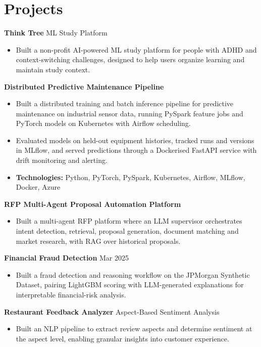\documentclass[10pt,a4paper]{article}
\begin{document}
\section{Projects}
\textbf{Think Tree} \textbar{} ML Study Platform\par
\begin{itemize}
  \item Built a non-profit AI-powered ML study platform for people with ADHD and context-switching challenges, designed to help users organize learning and maintain study context.
\end{itemize}
\textbf{Distributed Predictive Maintenance Pipeline}\par
\begin{itemize}
  \item Built a distributed training and batch inference pipeline for predictive maintenance on industrial sensor data, running PySpark feature jobs and PyTorch models on Kubernetes with Airflow scheduling.
  \item Evaluated models on held-out equipment histories, tracked runs and versions in MLflow, and served predictions through a Dockerised FastAPI service with drift monitoring and alerting.
  \item \textbf{Technologies:} Python, PyTorch, PySpark, Kubernetes, Airflow, MLflow, Docker, Azure
\end{itemize}
\textbf{RFP Multi-Agent Proposal Automation Platform}\par
\begin{itemize}
  \item Built a multi-agent RFP platform where an LLM supervisor orchestrates intent detection, retrieval, proposal generation, document matching and market research, with RAG over historical proposals.
\end{itemize}
\textbf{Financial Fraud Detection} \textbar{} Mar 2025\par
\begin{itemize}
  \item Built a fraud detection and reasoning workflow on the JPMorgan Synthetic Dataset, pairing LightGBM scoring with LLM-generated explanations for interpretable financial-risk analysis.
\end{itemize}
\textbf{Restaurant Feedback Analyzer} \textbar{} Aspect-Based Sentiment Analysis\par
\begin{itemize}
  \item Built an NLP pipeline to extract review aspects and determine sentiment at the aspect level, enabling granular insights into customer experience.
\end{itemize}
\end{document}
